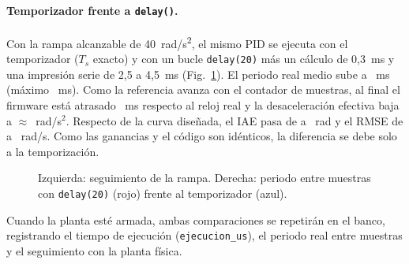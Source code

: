 \paragraph{Temporizador frente a \texttt{delay()}.} Con la rampa alcanzable de
\SI{40}{rad/s^2}, el mismo PID se ejecuta con el temporizador ($T_s$ exacto) y con un bucle
\texttt{delay(20)} más un cálculo de 0,3~ms y una impresión serie de 2,5 a 4,5~ms
(Fig.~\ref{fig:delay}). El periodo real medio sube a \periodoDelay~ms (máximo
\periodoMaxDelay~ms). Como la referencia avanza con el contador de muestras, al final el
firmware está atrasado \desfaseDelay~ms respecto al reloj real y la desaceleración efectiva
baja a $\approx$\decelEfectivaDelay~rad/s$^2$. Respecto de la curva diseñada, el IAE pasa de
\iaeTimer{} a \iaeDelay~rad y el RMSE de \rmseTimer{} a \rmseDelay~rad/s. Como las ganancias y
el código son idénticos, la diferencia se debe solo a la temporización.

\begin{figure}[h]
\centering
{}
\caption{\simulado{} Izquierda: seguimiento de la rampa. Derecha: periodo entre muestras con \texttt{delay(20)} (rojo) frente al temporizador (azul).}
\label{fig:delay}
\end{figure}

Cuando la planta esté armada, ambas comparaciones se repetirán en el banco, registrando el tiempo
de ejecución (\texttt{ejecucion\_us}), el periodo real entre muestras y el seguimiento con la planta física.
